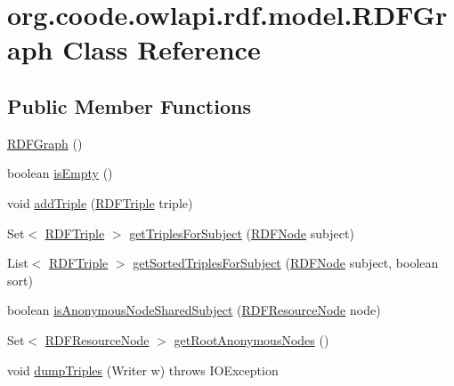 \hypertarget{classorg_1_1coode_1_1owlapi_1_1rdf_1_1model_1_1_r_d_f_graph}{\section{org.\-coode.\-owlapi.\-rdf.\-model.\-R\-D\-F\-Graph Class Reference}
\label{classorg_1_1coode_1_1owlapi_1_1rdf_1_1model_1_1_r_d_f_graph}
}
\subsection*{Public Member Functions}
\begin{DoxyCompactItemize}
\item 
\hyperlink{classorg_1_1coode_1_1owlapi_1_1rdf_1_1model_1_1_r_d_f_graph_aee696590fa630e2a16d5f49f5b0e1661}{R\-D\-F\-Graph} ()
\item 
boolean \hyperlink{classorg_1_1coode_1_1owlapi_1_1rdf_1_1model_1_1_r_d_f_graph_a97a19b88547a1af9c088108c84aa2707}{is\-Empty} ()
\item 
void \hyperlink{classorg_1_1coode_1_1owlapi_1_1rdf_1_1model_1_1_r_d_f_graph_a0258e7bc42bd0c157e30b2687685c40d}{add\-Triple} (\hyperlink{classorg_1_1coode_1_1owlapi_1_1rdf_1_1model_1_1_r_d_f_triple}{R\-D\-F\-Triple} triple)
\item 
Set$<$ \hyperlink{classorg_1_1coode_1_1owlapi_1_1rdf_1_1model_1_1_r_d_f_triple}{R\-D\-F\-Triple} $>$ \hyperlink{classorg_1_1coode_1_1owlapi_1_1rdf_1_1model_1_1_r_d_f_graph_a7eba5e0a22bb8951d14b70f39e320332}{get\-Triples\-For\-Subject} (\hyperlink{classorg_1_1coode_1_1owlapi_1_1rdf_1_1model_1_1_r_d_f_node}{R\-D\-F\-Node} subject)
\item 
List$<$ \hyperlink{classorg_1_1coode_1_1owlapi_1_1rdf_1_1model_1_1_r_d_f_triple}{R\-D\-F\-Triple} $>$ \hyperlink{classorg_1_1coode_1_1owlapi_1_1rdf_1_1model_1_1_r_d_f_graph_a9d6231c9efd4ec186c90f07a20492843}{get\-Sorted\-Triples\-For\-Subject} (\hyperlink{classorg_1_1coode_1_1owlapi_1_1rdf_1_1model_1_1_r_d_f_node}{R\-D\-F\-Node} subject, boolean sort)
\item 
boolean \hyperlink{classorg_1_1coode_1_1owlapi_1_1rdf_1_1model_1_1_r_d_f_graph_aeca8a1d5006c037b56468f7358e5787c}{is\-Anonymous\-Node\-Shared\-Subject} (\hyperlink{classorg_1_1coode_1_1owlapi_1_1rdf_1_1model_1_1_r_d_f_resource_node}{R\-D\-F\-Resource\-Node} node)
\item 
Set$<$ \hyperlink{classorg_1_1coode_1_1owlapi_1_1rdf_1_1model_1_1_r_d_f_resource_node}{R\-D\-F\-Resource\-Node} $>$ \hyperlink{classorg_1_1coode_1_1owlapi_1_1rdf_1_1model_1_1_r_d_f_graph_ab8d0c0334205eab394bfbd3ca1d8c9b3}{get\-Root\-Anonymous\-Nodes} ()
\item 
void \hyperlink{classorg_1_1coode_1_1owlapi_1_1rdf_1_1model_1_1_r_d_f_graph_a8621600208544bc9400f32ac064a701c}{dump\-Triples} (Writer w)  throws I\-O\-Exception 
\end{DoxyCompactItemize}
